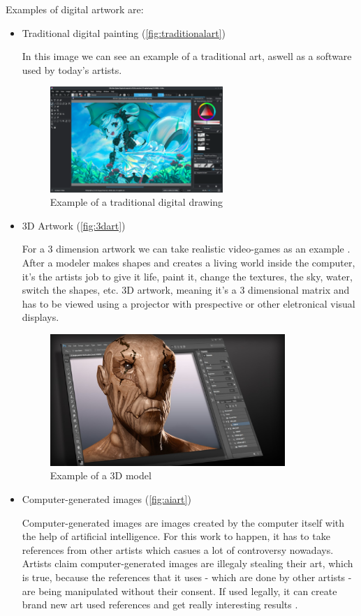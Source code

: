 \documentclass{report}
\begin{document}
Examples of digital artwork are:
	\begin{itemize}
	\item{Traditional digital painting} (\autoref{fig:traditionalart})
	
In this image we can see an example of a traditional art, aswell as a software used by today's artists.

	\begin{figure}[h]
	\center
	\includegraphics[height=4cm]{img/traditionaldigitalart}
	\caption{Example of a traditional digital drawing}
	\label{fig:traditionalart}
	\end{figure}	
	
	\item{3D Artwork} (\autoref{fig:3dart})
	
For a 3 dimension artwork we can take realistic video-games as an example . After a modeler makes shapes and creates a living world inside the computer, it's the artists job to give it life, paint it, change the textures, the sky, water, switch the shapes, etc. 3D artwork, meaning it's a 3 dimensional matrix and has to be viewed using a projector with prespective or other eletronical visual displays.

	\begin{figure}[h]
	\center
	\includegraphics[height=5cm]{img/3ddigitalart}
	\caption{Example of a 3D model}
	\label{fig:3dart}
	\end{figure}	
	
	\item{Computer-generated images} (\autoref{fig:aiart})
	
Computer-generated images are images created by the computer itself with the help of artificial intelligence. For this work to happen, it has to take references from other artists which casues a lot of controversy nowadays. Artists claim computer-generated images are illegaly stealing their art, which is true, because the references that it uses - which are done by other artists - are being manipulated without their consent. If used legally, it can create brand new art used references and get really interesting results .


\end{itemize}
\end{document}
